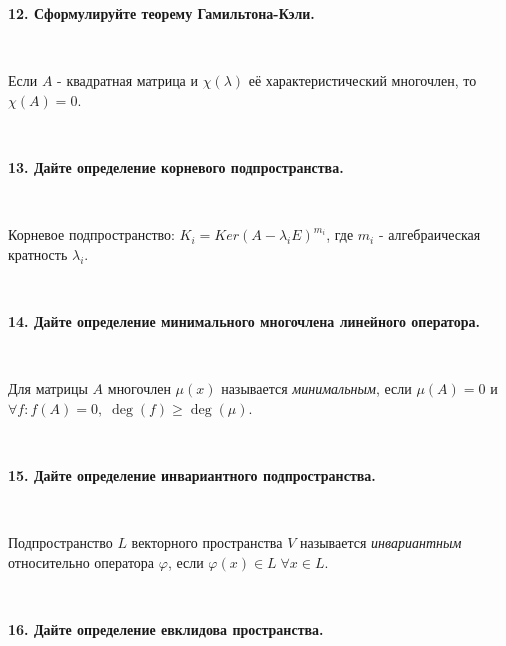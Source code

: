 \documentclass{article}
\begin{document}
	\textbf{12. Сформулируйте теорему Гамильтона-Кэли.}
	
	$\;$
	{
		\setlength{\parindent}{0.4cm}
		\hangindent=0.4cm	
		
		Если $A$ - квадратная матрица и $\chi(\lambda)$ её характеристический многочлен, то $\chi(A) = 0.$
		
		$\;$
		\setlength{\parindent}{0cm}
		\hangindent=0cm
	}
	
	\textbf {13. Дайте определение корневого подпространства.}
	
	{
		\setlength{\parindent}{0.4cm}
		\hangindent=0.4cm	
		$\;$
		
		Корневое подпространство: $K_i = Ker(A-\lambda_{i}E)^{m_i}$, где $m_i$ - алгебраическая кратность $\lambda_i$.
		
		$\;$
		\setlength{\parindent}{0cm}
		\hangindent=0cm
	}
	
	\textbf{14.	Дайте определение минимального многочлена линейного оператора.}
	
	$\;$
	{
		\setlength{\parindent}{0.4cm}
		\hangindent=0.4cm	
		
		Для матрицы $A$ многочлен $\mu(x)$ называется \textit{минимальным}, если $\mu(A) = 0$ и $\forall f : f(A) = 0, \; \deg(f) \geq \deg(\mu)$.
		
		$\;$
		\setlength{\parindent}{0cm}
		\hangindent=0cm
	}
	
	\textbf{15. Дайте определение инвариантного подпространства.}
	
	$\;$
	{
		\setlength{\parindent}{0.4cm}
		\hangindent=0.4cm	
		
		Подпространство $L$ векторного пространства $V$ называется \textit{инвариантным} относительно оператора $\varphi$, если $\varphi(x)\in L \; \forall x \in L.$
		
		$\;$
		\setlength{\parindent}{0cm}
		\hangindent=0cm
	}
	
	\textbf{16. Дайте определение евклидова пространства.}
	
\end{document}
